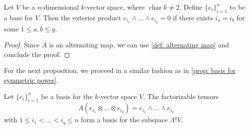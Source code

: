 \begin{proposition}
  Let \(V\) be a \(n\)-dimensional \(k\)-vector space, where
  \(\operatorname{char} k \neq 2\). Define \(\{e_i\}_{i=1}^n\) to be a base for
  \(V\). Then the exterior product \(e_{i_1} \wedge \dots \wedge e_{i_q} = 0\)
  if there exists \(i_a = i_b\) for some \(1 \leq a, b \leq q\).
\end{proposition}

\begin{proof}
  Since \(A\) is an alternating map, we can use \cref{def: alternating map} and
  conclude the proof.
\end{proof}

For the next proposition, we proceed in a similar fashion as in \cref{prop:
basis for symmetric power}.

\begin{proposition}
  \label{prop: exterior power basis}
  Let \(\{e_i\}_{i=1}^n\) be a basis for the \(k\)-vector space \(V\). The
  factorizable tensors
  \[
    A(e_{i_1} \otimes \dots \otimes e_{i_q}) = e_{i_1} \wedge \dots \wedge
    e_{i_q}
  \]
  with \(1 \leq i_1 < \dots < i_q \leq n\) form a basis for the subspace
  \(\Lambda^q V\).
\end{proposition}


